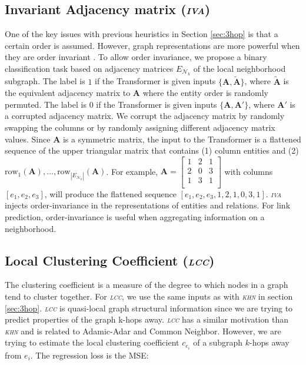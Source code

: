 \documentclass{article}
\newcommand{\hn}{\textsl{\textsc{khn}}\xspace}
\newcommand{\lcc}{\textsl{\textsc{lcc}}\xspace}
\newcommand{\iva}{\textsl{\textsc{iva}}\xspace}
\begin{document}
\subsection{Invariant Adjacency matrix (\iva)}
\label{sec:iva}
One of the key issues with previous heuristics in Section \ref{sec:3hop} is that a certain order is assumed.
However, graph representations are more powerful when they are order invariant \cite{inv_gnn_2017}. 
To allow order invariance, we propose a binary classification task based on adjacency matrices $E_{\mathcal{N}_k}$ of the local neighborhood subgraph. 
The label is $1$ if the Transformer is given inputs $\{\mathbf{A}, \widetilde{\mathbf{A}}\}$, where $\widetilde{\mathbf{A}}$ is the equivalent adjacency matrix to $\mathbf{A}$ where the entity order is randomly permuted.
The label is $0$ if the Transformer is given inputs $\{\mathbf{A}, \mathbf{A}'\}$, where $\mathbf{A}'$ is  a corrupted adjacency matrix.
We corrupt the adjacency matrix by randomly swapping the columns or by randomly assigning different adjacency matrix values.
Since $\mathbf{A}$ is a symmetric matrix, the input to the Transformer is a flattened sequence of the upper triangular matrix that contains (1) column entities and (2) $\text{row}_1(\mathbf{A}), \dots, \text{row}_{|E_{\mathcal{N}_k}|}(\mathbf{A})$. 
For example, $\mathbf{A} = \begin{bmatrix}
  1 & 2 & 1 \\
  2 & 0 & 3 \\
  1 & 3 & 1 \\
\end{bmatrix}$ with columns $[e_1,  e_2, e_3]$, will produce the flattened sequence $[e_1,  e_2, e_3, 1 , 2, 1, 0, 3, 1]$.
\iva injects order-invariance in the representations of entities and relations. 
For link prediction, order-invariance is useful when aggregating information on a neighborhood.


\subsection{Local Clustering Coefficient (\lcc)}
\label{sec:lcc}

The clustering coefficient is a measure of the degree to which nodes in a graph tend to cluster together.
For \lcc, we use the same inputs as with \hn in section \ref{sec:3hop}.
\lcc is quasi-local graph structural information since we are trying to predict properties of the graph k-hops away.
\lcc has a similar motivation than \hn and is related to Adamic-Adar and Common Neighbor.
However, we are trying to estimate the local clustering coefficient $c_{e_i}$ of a subgraph $k$-hops away from $e_i$. 
The regression loss is the MSE: 
\end{document}
